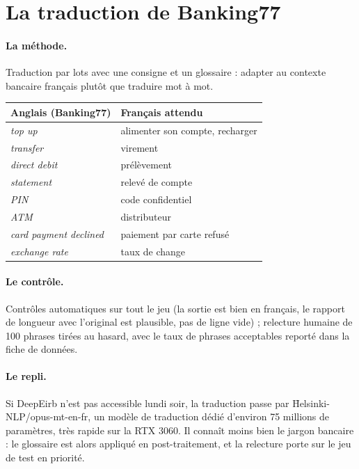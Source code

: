 \section{La traduction de Banking77}

\paragraph{La méthode.} Traduction par lots avec une consigne et un glossaire : adapter au contexte
bancaire français plutôt que traduire mot à mot.

\begin{center}\small
\begin{tabular}{@{}l l@{}}
\toprule
\textbf{Anglais (Banking77)} & \textbf{Français attendu} \\
\midrule
\emph{top up} & alimenter son compte, recharger \\
\emph{transfer} & virement \\
\emph{direct debit} & prélèvement \\
\emph{statement} & relevé de compte \\
\emph{PIN} & code confidentiel \\
\emph{ATM} & distributeur \\
\emph{card payment declined} & paiement par carte refusé \\
\emph{exchange rate} & taux de change \\
\bottomrule
\end{tabular}
\end{center}

\paragraph{Le contrôle.} Contrôles automatiques sur tout le jeu (la sortie est bien en français,
le rapport de longueur avec l'original est plausible, pas de ligne vide) ; relecture humaine de
100 phrases tirées au hasard, avec le taux de phrases acceptables reporté dans la fiche de données.

\paragraph{Le repli.} Si DeepEirb n'est pas accessible lundi soir, la traduction passe par
\f{Helsinki-NLP/opus-mt-en-fr}, un modèle de traduction dédié d'environ 75 millions de paramètres,
très rapide sur la RTX 3060. Il connaît moins bien le jargon bancaire : le glossaire est alors
appliqué en post-traitement, et la relecture porte sur le jeu de test en priorité.

